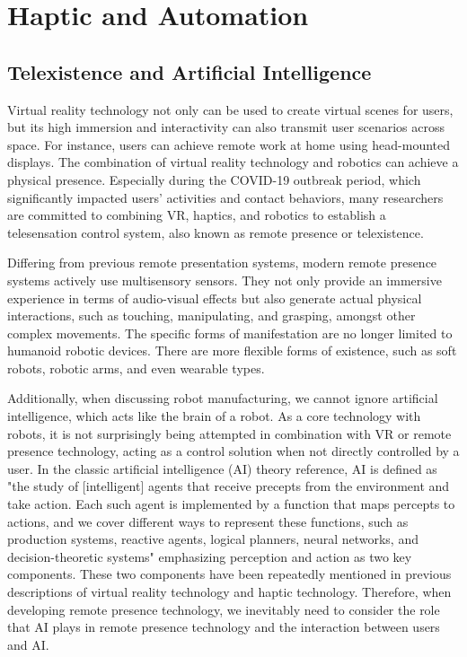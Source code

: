 \section{Haptic and Automation}
\subsection{Telexistence and Artificial Intelligence}
Virtual reality technology not only can be used to create virtual scenes for users, but its high immersion and interactivity can also transmit user scenarios across space. For instance, users can achieve remote work at home using head-mounted displays. The combination of virtual reality technology and robotics can achieve a physical presence. Especially during the COVID-19 outbreak period, which significantly impacted users' activities and contact behaviors, many researchers are committed to combining VR, haptics, and robotics to establish a telesensation control system, also known as remote presence or telexistence. 

Differing from previous remote presentation systems\cite{paper23}, modern remote presence systems actively use multisensory sensors. They not only provide an immersive experience in terms of audio-visual effects but also generate actual physical interactions, such as touching, manipulating, and grasping, amongst other complex movements. The specific forms of manifestation are no longer limited to humanoid robotic devices. There are more flexible forms of existence, such as soft robots, robotic arms, and even wearable types\cite{paper24}.

Additionally, when discussing robot manufacturing, we cannot ignore artificial intelligence, which acts like the brain of a robot. As a core technology with robots, it is not surprisingly being attempted in combination with VR\cite{paper25} or remote presence technology, acting as a control solution when not directly controlled by a user. In the classic artificial intelligence (AI) theory reference\cite{paper26}, AI is defined as "the study of [intelligent] agents that receive precepts from the environment and take action. Each such agent is implemented by a function that maps percepts to actions, and we cover different ways to represent these functions, such as production systems, reactive agents, logical planners, neural networks, and decision-theoretic systems" emphasizing perception and action as two key components. These two components have been repeatedly mentioned in previous descriptions of virtual reality technology and haptic technology. Therefore, when developing remote presence technology, we inevitably need to consider the role that AI plays in remote presence technology and the interaction between users and AI.

